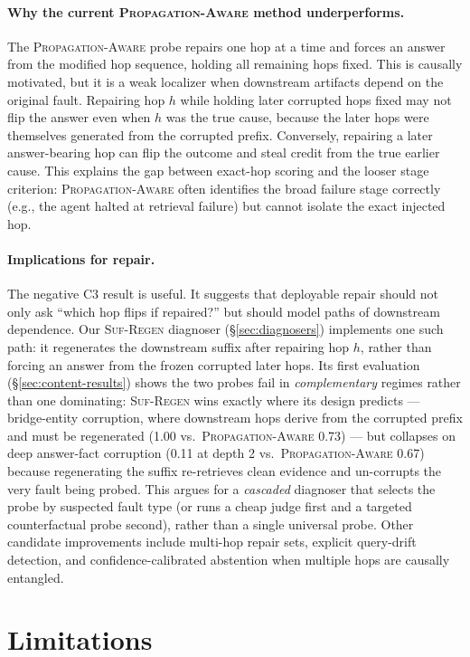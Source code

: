 \documentclass[11pt]{article}
\newcommand{\pa}{\textnormal{\textsc{Propagation-Aware}}}
\newcommand{\sr}{\textnormal{\textsc{Suf-Regen}}}
\begin{document}
\paragraph{Why the current \pa{} method underperforms.}
The \pa{} probe repairs one hop at a time and forces an answer from the modified
hop sequence, holding all remaining hops fixed.  This is causally motivated, but
it is a weak localizer when downstream artifacts depend on the original fault.
Repairing hop $h$ while holding later corrupted hops fixed may not flip the
answer even when $h$ was the true cause, because the later hops were themselves
generated from the corrupted prefix.  Conversely, repairing a later
answer-bearing hop can flip the outcome and steal credit from the true earlier
cause.  This explains the gap between exact-hop scoring and the looser stage
criterion: \pa{} often identifies the broad failure stage correctly (e.g., the
agent halted at retrieval failure) but cannot isolate the exact injected hop.

\paragraph{Implications for repair.}
\label{sec:implications}
The negative C3 result is useful.  It suggests that deployable repair should not
only ask ``which hop flips if repaired?'' but should model paths of downstream
dependence.  Our \sr{} diagnoser (\S\ref{sec:diagnosers}) implements one such
path: it regenerates the downstream suffix after repairing hop $h$, rather than
forcing an answer from the frozen corrupted later hops.  Its first evaluation
(\S\ref{sec:content-results}) shows the two probes fail in \emph{complementary}
regimes rather than one dominating: \sr{} wins exactly where its design
predicts --- bridge-entity corruption, where downstream hops derive from the
corrupted prefix and must be regenerated (1.00 vs.\ \pa{} 0.73) --- but
collapses on deep answer-fact corruption (0.11 at depth 2 vs.\ \pa{} 0.67)
because regenerating the suffix re-retrieves clean evidence and un-corrupts the
very fault being probed.  This argues for a \emph{cascaded} diagnoser that
selects the probe by suspected fault type (or runs a cheap judge first and a
targeted counterfactual probe second), rather than a single universal probe.
Other candidate improvements include multi-hop repair sets, explicit
query-drift detection, and confidence-calibrated abstention when multiple hops
are causally entangled.

\section{Limitations}
\end{document}
